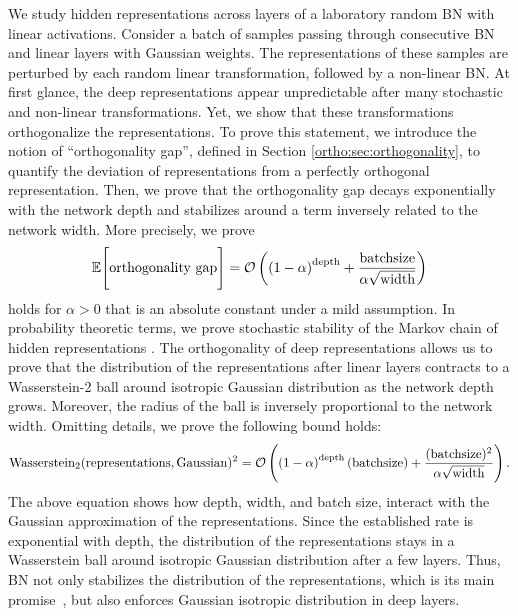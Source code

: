 We study hidden representations across layers of a laboratory random BN with linear activations. Consider a batch of samples passing through consecutive BN and linear layers with Gaussian weights. The representations of these samples are perturbed by each random linear transformation, followed by a non-linear BN. At first glance, the deep representations appear unpredictable after many stochastic and non-linear transformations. Yet, we show that these transformations orthogonalize the representations. To prove this statement, we introduce the notion of  ``orthogonality gap'', defined in Section \ref{ortho:sec:orthogonality}, to quantify the deviation of representations from a perfectly orthogonal representation. Then, we prove that the orthogonality gap decays exponentially with the network depth and stabilizes around a term inversely related to the network width. More precisely, we prove 
\begin{align} \nonumber
     \mathbb{E}\Bigg[ \text{orthogonality gap} \Bigg] = \mathcal{O}\left( \left(1-\alpha\right)^{\text{depth}}+ \frac{\text{batchsize}}{\alpha\sqrt{\text{width}}}\right)
\end{align}
holds for $\alpha>0$ that is an absolute constant under a mild assumption. In probability theoretic terms, we prove stochastic stability of the Markov chain of hidden representations \citep{kushner1967stochastic,kushner2003stochastic,khasminskii2011stochastic}. The orthogonality of deep representations allows us to prove that the distribution of the representations after linear layers contracts to a Wasserstein-2 ball around isotropic Gaussian distribution as the network depth grows. Moreover, the radius of the ball is inversely proportional to the network width. Omitting details, we prove the following bound holds:
\begin{align} \nonumber
    \text{Wasserstein}_2(\text{representations},\text{Gaussian})^2= \mathcal{O}\left( \left(1-\alpha\right)^{\text{depth}}\left(\text{batchsize}\right)+ \frac{ (\text{batchsize})^2}{\alpha\sqrt{\text{width}}}\right).
\end{align}
The above equation shows how depth,  width, and batch size, interact with the Gaussian approximation of the representations. Since the established rate is exponential with depth, the distribution of the representations stays in a Wasserstein ball around isotropic Gaussian distribution after a few layers. Thus, BN not only stabilizes the distribution of the representations, which is its main promise~\citep{ioffe2015batch}, but also enforces Gaussian isotropic distribution in deep layers. 

